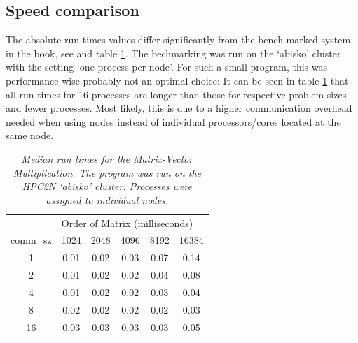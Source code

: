 \documentclass[a4paper,11pt,twoside]{article}
\begin{document}
\subsection{Speed comparison}
The absolute run-times values differ significantly from the bench-marked system in the book, see \cite[p. 123]{pacheco2011} and table \ref{tab:runtimes}. The bechmarking was run on the `abisko' cluster with the setting `one process per node'. For such a small program, this was performance wise probably not an optimal choice: It can be seen in table \ref{tab:runtimes} that all run times for 16 processes are longer than those for respective problem sizes and fewer processes. Most likely, this is due to a higher communication overhead needed when using nodes instead of individual processors/cores located at the same node.  
\begin{table}[]
\centering
\caption{\textit{Median run times for the Matrix-Vector Multiplication. The program was run on the HPC2N `abisko' cluster. Processes were assigned to individual nodes.}}
\label{tab:runtimes}
\begin{tabular}{cccccc}
\multicolumn{1}{l|}{}         & \multicolumn{5}{l|}{Order of Matrix (milliseconds)}                                                                   \\ \cline{2-6} 
\multicolumn{1}{l|}{comm\_sz} & \multicolumn{1}{c|}{1024} & \multicolumn{1}{c|}{2048} & \multicolumn{1}{c|}{4096} & \multicolumn{1}{c|}{8192} & 16384 \\
1                             & 0.01                      & 0.02                      & 0.03                      & 0.07                      & 0.14  \\
2                             & 0.01                      & 0.02                      & 0.02                      & 0.04                      & 0.08  \\
4                             & 0.01                      & 0.02                      & 0.02                      & 0.03                      & 0.04  \\
8                             & 0.02                      & 0.02                      & 0.02                      & 0.02                      & 0.03  \\
16                            & 0.03                      & 0.03                      & 0.03                      & 0.03                      & 0.05 
\end{tabular}
\end{table}
\end{document}
